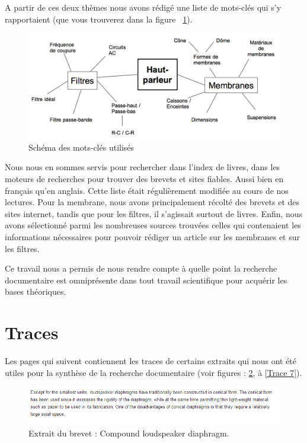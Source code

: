 A partir de ces deux thèmes nous avons rédigé une liste de mots-clés qui s'y rapportaient (que vous trouverez dans la figure ~\ref{Schema mots-clefs}).

\begin{figure}
\begin{center}
\includegraphics[scale=0.35]{img/Mots-clefs.png}
\end{center}
\caption{Schéma des mots-clés utilisés}
 \label{Schema mots-clefs}
\end{figure}

Nous nous en sommes servis pour rechercher dans l'index de livres, dans les moteurs de recherches pour trouver des brevets et sites fiables. Aussi bien en français qu'en anglais. Cette liste était régulièrement modifiée au cours de nos lectures. Pour la membrane, nous avons principalement récolté des brevets et des sites internet, tandis que pour les filtres, il s'agissait surtout de livres. 
Enfin, nous avons sélectionné parmi les nombreuses sources trouvées celles qui contenaient les informations nécessaires pour pouvoir rédiger un article sur les membranes et sur les filtres.
\newline

Ce travail nous a permis de nous rendre compte à quelle point la recherche documentaire est omniprésente dans tout travail scientifique pour acquérir les bases théoriques.
\newline

\section{Traces}

Les pages qui suivent contiennent les traces de certains extraits qui nous ont été utiles pour la synthèse de la recherche documentaire (voir figures : \ref{Trace 1}, à \ref{Trace 7}).

\begin{figure}[h]
\begin{center}
\includegraphics[scale=0.8]{img/Trace1-brevet-US-3153463.png}
\end{center}
\caption{Extrait du brevet : \og Compound loudspeaker diaphragm.\fg  \cite{f1964compound}} %
\label{Trace 1}
\end{figure}

